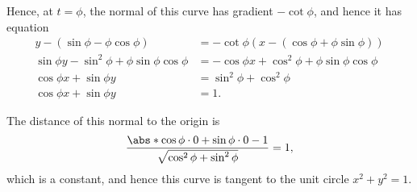 \begin{enumerate}
          Hence, at \(t = \phi\), the normal of this curve has gradient \(- \cot \phi\), and hence it has equation
          \begin{align*}
              y - \left(\sin \phi - \phi \cos \phi\right)          & = - \cot \phi \left(x - \left(\cos \phi + \phi \sin \phi\right)\right) \\
              \sin \phi y - \sin^2 \phi + \phi \sin \phi \cos \phi & = - \cos \phi x + \cos^2 \phi + \phi \sin \phi \cos \phi               \\
              \cos \phi x + \sin \phi y                            & = \sin^2 \phi + \cos^2 \phi                                            \\
              \cos \phi x + \sin \phi y                            & = 1.
          \end{align*}

          The distance of this normal to the origin is
          \[
              \frac{\abs*{\cos \phi \cdot 0 + \sin \phi \cdot 0 - 1}}{\sqrt{\cos^2 \phi + \sin^2 \phi}} = 1,
          \]
          which is a constant, and hence this curve is tangent to the unit circle \(x^2 + y^2 = 1\).
\end{enumerate}